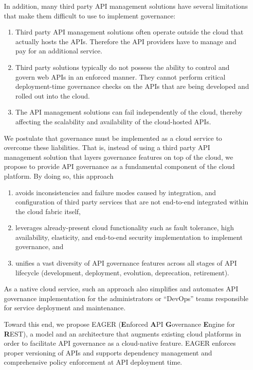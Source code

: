 In addition, many third party 
API management solutions have several limitations that make them difficult to
use to implement governance:
\begin{enumerate}
\item Third party API management solutions often operate outside the cloud that actually hosts the APIs. Therefore 
the API providers have to manage and pay for an additional service.
\item Third party solutions typically do not possess the ability to control and govern web APIs in an enforced manner. They cannot perform 
critical deployment-time governance checks on the APIs that are being developed and rolled out into the cloud. 
\item The API management solutions can fail independently of the cloud, thereby affecting the scalability and availability of the cloud-hosted APIs. 
\end{enumerate}

We postulate that governance must be implemented as a cloud service to
overcome these liabilities.
That is, instead of using a third party API management
solution that layers governance features on top of the cloud, 
we propose to provide API governance as a fundamental component of the cloud
platform.  By doing so, this approach
\begin{enumerate}
\item avoids inconsistencies and failure modes caused  
by integration, and configuration of third party services that are not
end-to-end integrated within the cloud fabric itself, 
\item leverages already-present cloud functionality such as fault tolerance,
high availability, elasticity, and end-to-end security implementation to
implement governance, and
\item unifies a vast diversity of API
governance features across all stages of API lifecycle
(development, deployment, evolution, deprecation, retirement). 
\end{enumerate}
As a native cloud service, such an
approach also simplifies and automates API governance implementation for
the administrators or ``DevOps'' teams responsible for service deployment and
maintenance.

Toward this end, we propose EAGER ({\bf E}nforced {\bf A}PI {\bf G}overnance
{\bf E}ngine for {\bf R}EST), a model and an architecture that augments existing
cloud platforms in order to facilitate API governance as a 
cloud-native feature. EAGER enforces proper versioning of APIs and supports dependency 
management and comprehensive policy enforcement at API deployment time. 

